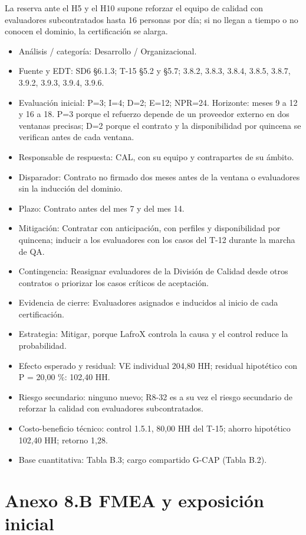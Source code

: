 La reserva ante el H5 y el H10 supone reforzar el equipo de calidad con evaluadores subcontratados hasta 16 personas por día; si no llegan a tiempo o no conocen el dominio, la certificación se alarga.

\begin{itemize}[leftmargin=*,itemsep=3pt]
\item Análisis / categoría: Desarrollo / Organizacional.
\item Fuente y EDT: SD6 §6.1.3; T-15 §5.2 y §5.7; 3.8.2, 3.8.3, 3.8.4, 3.8.5, 3.8.7, 3.9.2, 3.9.3, 3.9.4, 3.9.6.
\item Evaluación inicial: P=3; I=4; D=2; E=12; NPR=24. Horizonte: meses 9 a 12 y 16 a 18. P=3 porque el refuerzo depende de un proveedor externo en dos ventanas precisas; D=2 porque el contrato y la disponibilidad por quincena se verifican antes de cada ventana.
\item Responsable de respuesta: CAL, con su equipo y contrapartes de su ámbito.
\item Disparador: Contrato no firmado dos meses antes de la ventana o evaluadores sin la inducción del dominio.
\item Plazo: Contrato antes del mes 7 y del mes 14.
\item Mitigación: Contratar con anticipación, con perfiles y disponibilidad por quincena; inducir a los evaluadores con los casos del T-12 durante la marcha de QA.
\item Contingencia: Reasignar evaluadores de la División de Calidad desde otros contratos o priorizar los casos críticos de aceptación.
\item Evidencia de cierre: Evaluadores asignados e inducidos al inicio de cada certificación.
\item Estrategia: Mitigar, porque LafroX controla la causa y el control reduce la probabilidad.
\item Efecto esperado y residual: VE individual 204,80 HH; residual hipotético con P = 20,00 \%: 102,40 HH.
\item Riesgo secundario: ninguno nuevo; R8-32 es a su vez el riesgo secundario de reforzar la calidad con evaluadores subcontratados.
\item Costo-beneficio técnico: control 1.5.1, 80,00 HH del T-15; ahorro hipotético 102,40 HH; retorno 1,28.
\item Base cuantitativa: Tabla B.3; cargo compartido G-CAP (Tabla B.2).
\end{itemize}

\clearpage
\section*{Anexo 8.B \textemdash{} FMEA y exposición inicial}

